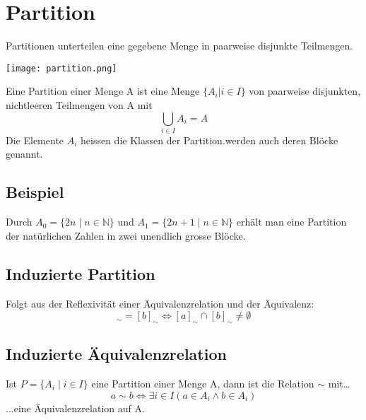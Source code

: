 \section{Partition}
Partitionen unterteilen eine gegebene Menge in paarweise disjunkte
Teilmengen.
\begin{center}
    \texttt{[image: partition.png]}
\end{center}
Eine Partition einer Menge A ist eine Menge $\{A_i | i \in I\}$ von
paarweise disjunkten, nichtleeren Teilmengen von A mit
\begin{equation}
    \bigcup_{i \in I} A_i = A
\end{equation}
Die Elemente $A_i$ heissen die Klassen der Partition.werden auch deren Blöcke genannt.
\subsection{Beispiel}
Durch $A_0 = \{2n \mid n \in \mathbb{N}\}$ und $A_1 = \{2n+1 \mid n \in \mathbb{N}\}$ erhält
man eine Partition der natürlichen Zahlen in zwei unendlich grosse Blöcke.

\subsection{Induzierte Partition}
Folgt aus der Reflexivität einer Äquivalenzrelation und der
Äquivalenz:
\begin{equation}
    [a]_{\sim} = [b]_{\sim} \Leftrightarrow [a]_{\sim} \cap [b]_{\sim} \neq \emptyset
\end{equation}
\subsection{Induzierte Äquivalenzrelation}
Ist $P = \{A_i \mid i \in I \}$ eine Partition einer Menge A, dann ist die Relation $\sim$ mit\dots
\begin{equation}
    a \sim b \Leftrightarrow \exists{i} \in I(a \in A_i \wedge b \in A_i)
\end{equation}
...eine Äquivalenzrelation auf A.